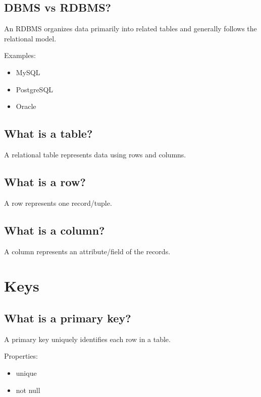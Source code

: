 \medskip

\subsection{DBMS vs RDBMS?}

An RDBMS organizes data primarily into related tables and generally follows the relational model.

Examples:

\begin{itemize}
  \item MySQL
  \item PostgreSQL
  \item Oracle
\end{itemize}

\medskip

\subsection{What is a table?}

A relational table represents data using rows and columns.

\medskip

\subsection{What is a row?}

A row represents one record/tuple.

\medskip

\subsection{What is a column?}

A column represents an attribute/field of the records.

\medskip

\section{Keys}

\subsection{What is a primary key?}

A primary key uniquely identifies each row in a table.

Properties:

\begin{itemize}
  \item unique
  \item not null
\end{itemize}

